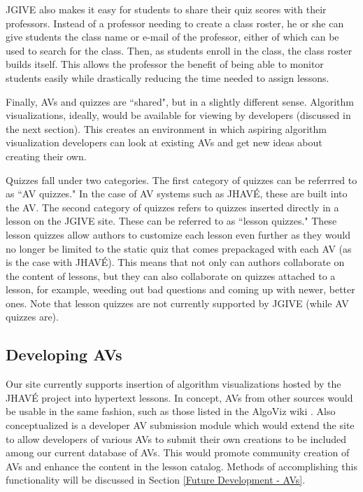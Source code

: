 \documentclass{acm_proc_article-sp}
\begin{document}
JGIVE also makes it easy for students to share their quiz scores with their professors. Instead of a professor needing to create a class roster, he or she can give students the class name or e-mail of the professor, either of which can be used to search for the class. Then, as students enroll in the class, the class roster builds itself. This allows the professor the benefit of being able to monitor students easily while drastically reducing the time needed to assign lessons.

Finally, AVs and quizzes are ``shared", but in a slightly different sense. Algorithm visualizations, ideally, would be available for viewing by developers (discussed in the next section). This creates an environment in which aspiring algorithm visualization developers can look at existing AVs and get new ideas about creating their own.

Quizzes fall under two categories. The first category of quizzes can be referrred to as ``AV quizzes." In the case of AV systems such as JHAV\'{E}, these are built into the AV. The second category of quizzes refers to quizzes inserted directly in a lesson on the JGIVE site. These can be referred to as ``lesson quizzes." These lesson quizzes allow authors to customize each lesson even further as they would no longer be limited to the static quiz that comes prepackaged with each AV (as is the case with JHAV\'{E}). This means that not only can authors collaborate on the content of lessons, but they can also collaborate on quizzes attached to a lesson, for example, weeding out bad questions and coming up with newer, better ones. Note that lesson quizzes are not currently supported by JGIVE (while AV quizzes are).

\subsection{Developing AVs}
Our site currently supports insertion of algorithm visualizations hosted by the JHAV\'{E} project \cite{jhave} into hypertext lessons. In concept, AVs from other sources would be usable in the same fashion, such as those listed in the AlgoViz wiki \cite{algoviz}. Also conceptualized is a developer AV submission module which would extend the site to allow developers of various AVs to submit their own creations to be included among our current database of AVs. This would promote community creation of AVs and enhance the content in the lesson catalog. Methods of accomplishing this functionality will be discussed in Section \ref{Future Development - AVs}.
\end{document}
